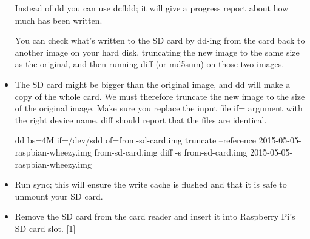 \documentclass[11pt,a4paper]{report}
\begin{document}
\begin{itemize}
			Instead of dd you can use dcfldd; it will give a progress report about how much has been written.
			
			You can check what's written to the SD card by dd-ing from the card back to another image on your hard disk, truncating the new image to the same size as the original, and then running diff (or md5sum) on those two images.
			
			\item The SD card might be bigger than the original image, and dd will make a copy of the whole card. We must therefore truncate the new image to the size of the original image. Make sure you replace the input file if= argument with the right device name. diff should report that the files are identical.
			
			dd bs=4M if=/dev/sdd of=from-sd-card.img
			truncate --reference 2015-05-05-raspbian-wheezy.img from-sd-card.img
			diff -s from-sd-card.img 2015-05-05-raspbian-wheezy.img
			\item Run sync; this will ensure the write cache is flushed and that it is safe to unmount your SD card.
			\item Remove the SD card from the card reader and insert it into Raspberry Pi's SD card slot. [1]
		\end{itemize}
		
\end{document}
